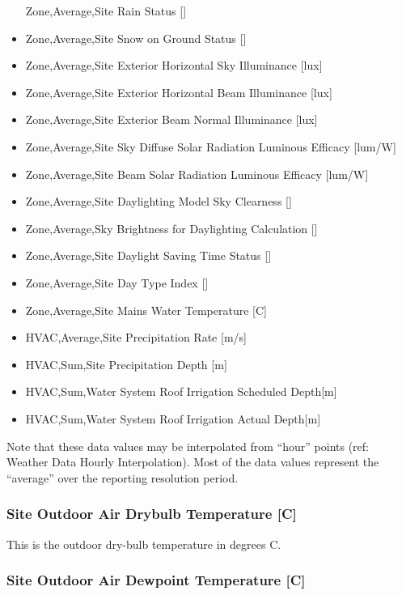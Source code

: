 \begin{itemize}
  Zone,Average,Site Rain Status {[]}
\item
  Zone,Average,Site Snow on Ground Status {[]}
\item
  Zone,Average,Site Exterior Horizontal Sky Illuminance {[}lux{]}
\item
  Zone,Average,Site Exterior Horizontal Beam Illuminance {[}lux{]}
\item
  Zone,Average,Site Exterior Beam Normal Illuminance {[}lux{]}
\item
  Zone,Average,Site Sky Diffuse Solar Radiation Luminous Efficacy {[}lum/W{]}
\item
  Zone,Average,Site Beam Solar Radiation Luminous Efficacy {[}lum/W{]}
\item
  Zone,Average,Site Daylighting Model Sky Clearness {[]}
\item
  Zone,Average,Sky Brightness for Daylighting Calculation {[]}
\item
  Zone,Average,Site Daylight Saving Time Status {[]}
\item
  Zone,Average,Site Day Type Index {[]}
\item
  Zone,Average,Site Mains Water Temperature {[}C{]}
\item
  HVAC,Average,Site Precipitation Rate {[}m/s{]}
\item
  HVAC,Sum,Site Precipitation Depth {[}m{]}
\item
  HVAC,Sum,Water System Roof Irrigation Scheduled Depth{[}m{]}
\item
  HVAC,Sum,Water System Roof Irrigation Actual Depth{[}m{]}
\end{itemize}

Note that these data values may be interpolated from ``hour'' points (ref: Weather Data Hourly Interpolation). Most of the data values represent the ``average'' over the reporting resolution period.

\subsubsection{Site Outdoor Air Drybulb Temperature {[}C{]}}\label{site-outdoor-air-drybulb-temperature-c}

This is the outdoor dry-bulb temperature in degrees C.

\subsubsection{Site Outdoor Air Dewpoint Temperature {[}C{]}}\label{site-outdoor-air-dewpoint-temperature-c}

